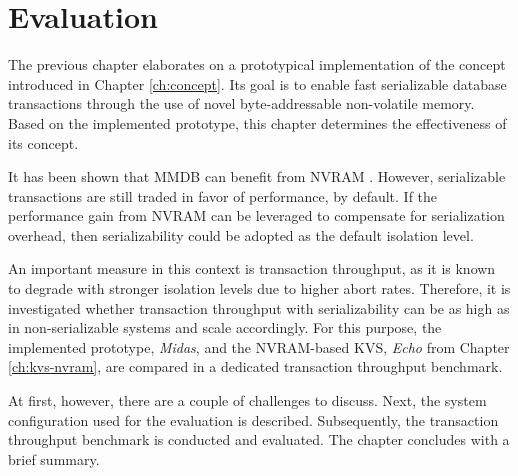 \chapter{Evaluation}
\label{ch:eval}

The previous chapter elaborates on a prototypical implementation of the concept
introduced in Chapter \ref{ch:concept}. Its goal is to enable fast serializable
database transactions through the use of novel byte-addressable non-volatile
memory. Based on the implemented prototype, this chapter determines the
effectiveness of its concept.

It has been shown that MMDB can benefit from NVRAM \cite{bailey2013exploring,
schwalb2016hyrise, oukid2017data, andrei2017sap}. However, serializable
transactions are still traded in favor of performance, by default. If the
performance gain from NVRAM can be leveraged to compensate for serialization
overhead, then serializability could be adopted as the default isolation level.


An important measure in this context is transaction throughput, as it is known
to degrade with stronger isolation levels due to higher abort rates. Therefore,
it is investigated whether transaction throughput with serializability can be as
high as in non-serializable systems and scale accordingly. For this purpose, the
implemented prototype, \emph{Midas}, and the NVRAM-based KVS, \emph{Echo} from
Chapter \ref{ch:kvs-nvram}, are compared in a dedicated transaction throughput
benchmark.



At first, however, there are a couple of challenges to discuss. Next, the system
configuration used for the evaluation is described. Subsequently, the
transaction throughput benchmark is conducted and evaluated. The chapter
concludes with a brief summary.

